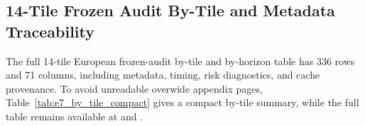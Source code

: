 \documentclass[lettersize,journal]{IEEEtran}
\begin{document}
\subsection{14-Tile Frozen Audit By-Tile and Metadata Traceability}
\label{app:e7_by_tile_horizon}\label{app:e7_metadata_catalog_thresholds}
The full 14-tile European frozen-audit by-tile and by-horizon table has 336 rows and 71 columns, including metadata, timing, risk diagnostics, and cache provenance. To avoid unreadable overwide appendix pages, Table~\ref{tab:e7_by_tile_compact} gives a compact by-tile summary, while the full table remains available at  and .
\end{document}
